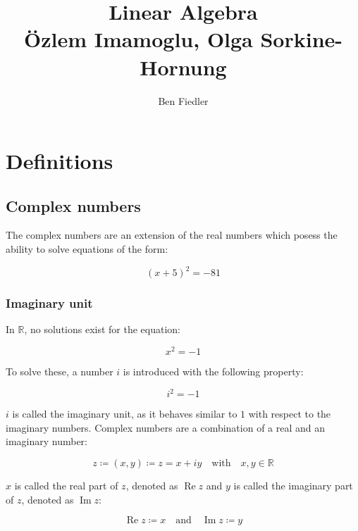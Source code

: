 \documentclass[a4paper,12pt]{article}
\newcommand{\uniti}{i}
\newcommand{\defas}{\coloneqq}
\renewcommand{\Re}[1]{\operatorname{Re}{#1}}
\renewcommand{\Im}[1]{\operatorname{Im}{#1}}
\newcommand{\R}{\mathbb{R}}
\theoremstyle{plain}
\numberwithin{equation}{section}
\begin{document}
\author{Ben Fiedler}
\title{Linear Algebra \\
       \large{Özlem Imamoglu, Olga Sorkine-Hornung}}

\maketitle
\tableofcontents

\newpage

\section{Definitions}

\subsection{Complex numbers}

The complex numbers are an extension of the real numbers which posess the ability to
solve equations of the form:

$$ (x + 5) ^ 2 = -81 $$

\subsubsection{Imaginary unit}

In $\R$, no solutions exist for the equation:

\begin{equation}
    x^2 = {-1}
\end{equation}

To solve these, a number $\uniti$ is introduced with the following property:

\begin{equation}
    \uniti^2 = {-1}
\end{equation}

$\uniti$ is called the imaginary unit, as it behaves similar to $1$ with respect to
the imaginary numbers. Complex numbers are a combination of a real and an imaginary number:

\begin{equation}
    z \defas (x, y) \defas z = x + \uniti y \quad \text{with} \quad x, y \in \R
\end{equation}

$x$ is called the real part of $z$, denoted as $\Re{z}$ and $y$ is called the
imaginary part of $z$, denoted as $\Im{z}$:

$$ \Re{z} \defas x \quad \text{and} \quad \Im{z} \defas y $$
\end{document}
